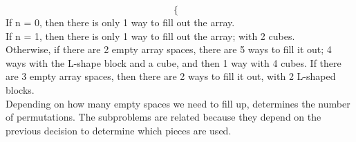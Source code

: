\documentclass[11pt]{article}
\begin{document}
\begin{enumerate}
\begin{equation}
\begin{cases}
\end{cases}
\end{equation}
If n = 0, then there is only 1 way to fill out the array.\\
If n = 1, then there is only 1 way to fill out the array; with 2 cubes.\\
Otherwise, if there are 2 empty array spaces, there are 5 ways to fill it out; 4 ways with the L-shape block and a cube, and then 1 way with 4 cubes. If there are 3 empty array spaces, then there are 2 ways to fill it out, with 2 L-shaped blocks.\\
Depending on how many empty spaces we need to fill up, determines the number of permutations. The subproblems are related because they depend on the previous decision to determine which pieces are used.


\end{enumerate}
\end{document}
